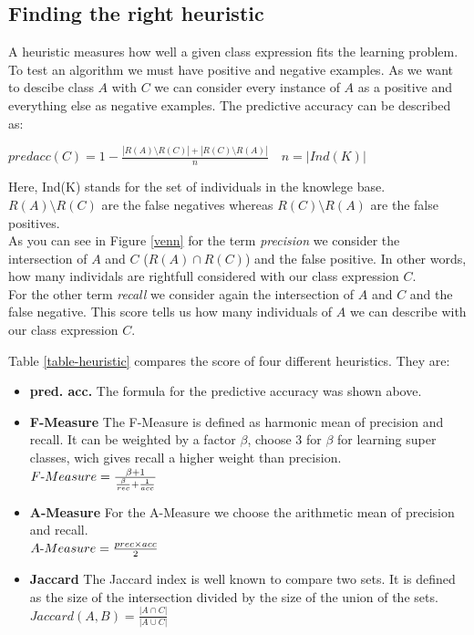 \subsection{Finding the right heuristic}
A heuristic measures how well a given class expression fits the learning
problem. \cite{paper1}
To test an algorithm we must have positive and negative examples. As we want to
descibe class $A$ with $C$ we can consider every instance of $A$ as a positive
and everything else as negative examples.
The predictive accuracy can be described as:\vspace{6pt}\\
\centerline{
$
predacc(C) = 1 - \frac{|R(A) \setminus R(C)| + |R(C) \setminus R(A)|}{n} \quad n
= |Ind(K)| $
}\vspace{6pt}
Here, Ind(K) stands for the set of individuals in the knowlege base. $R(A)
\setminus R(C)$ are the false negatives whereas $R(C) \setminus R(A)$ are the
false positives. \\
As you can see in Figure \ref{venn} for the term \emph{precision} we
consider the intersection of $A$ and $C$ ($R(A) \cap R(C)$) and the false
positive. In other words, how many individals are rightfull considered with our
class expression $C$.\\
For the other term \emph{recall} we consider again the intersection of $A$ and
$C$ and the false negative. This score tells us how many individuals of $A$ we
can describe with our class expression $C$.

Table \ref{table-heuristic} compares the score of four different heuristics.
They are:
\begin{itemize}
  \item{\textbf{pred. acc.}} The formula for the predictive accuracy was shown
  above.
  \item{\textbf{F-Measure}} The F-Measure is defined as harmonic mean of
  precision and recall. It can be weighted by a factor $\beta$, \cite{paper1} choose 3 for
  $\beta$ for learning super classes, wich gives recall a higher weight than
  precision.\\
  $F{\hbox{-}} Measure = \frac{\beta + 1}{\frac{\beta}{rec} +
  \frac{1}{acc}}$
  \item{\textbf{A-Measure}} For the A-Measure we choose the arithmetic mean of
  precision and recall.\\
  $A{\hbox{-}} Measure = \frac{prec \times acc }{2}$
  \item{\textbf{Jaccard}} The Jaccard index is well known to compare two sets.
  It is defined as the size of the intersection divided by the size of the union
  of the sets. $Jaccard(A,B) = \frac{|A \cap C|}{|A \cup C|}$
\end{itemize}



